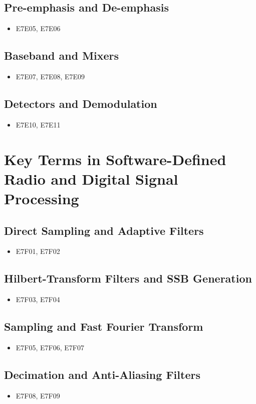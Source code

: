 \documentclass{book}
\begin{document}
\subsection{Pre-emphasis and De-emphasis}
\begin{itemize}
    \item E7E05, E7E06
\end{itemize}
\subsection{Baseband and Mixers}
\begin{itemize}
    \item E7E07, E7E08, E7E09
\end{itemize}
\subsection{Detectors and Demodulation}
\begin{itemize}
    \item E7E10, E7E11
\end{itemize}

\section{Key Terms in Software-Defined Radio and Digital Signal Processing}
\subsection{Direct Sampling and Adaptive Filters}
\begin{itemize}
    \item E7F01, E7F02
\end{itemize}
\subsection{Hilbert-Transform Filters and SSB Generation}
\begin{itemize}
    \item E7F03, E7F04
\end{itemize}
\subsection{Sampling and Fast Fourier Transform}
\begin{itemize}
    \item E7F05, E7F06, E7F07
\end{itemize}
\subsection{Decimation and Anti-Aliasing Filters}
\begin{itemize}
    \item E7F08, E7F09
\end{itemize}
\end{document}
